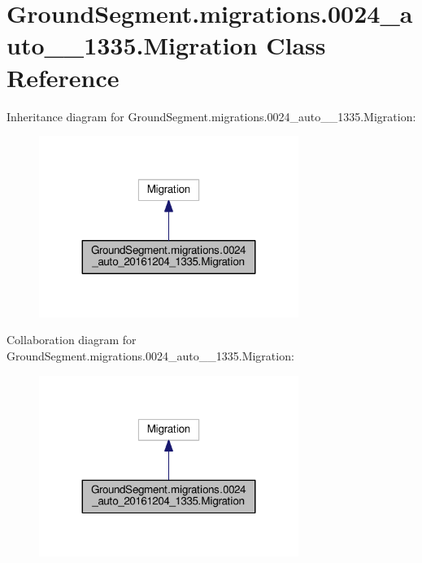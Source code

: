 \hypertarget{class_ground_segment_1_1migrations_1_10024__auto__20161204__1335_1_1_migration}{}\section{Ground\+Segment.\+migrations.0024\+\_\+auto\+\_\+\_\+1335.Migration Class Reference}
\label{class_ground_segment_1_1migrations_1_10024__auto__20161204__1335_1_1_migration}


Inheritance diagram for Ground\+Segment.\+migrations.0024\+\_\+auto\+\_\+\_\+1335.Migration\+:\nopagebreak
\begin{figure}[H]
\begin{center}
\leavevmode
\includegraphics[width=239pt]{class_ground_segment_1_1migrations_1_10024__auto__20161204__1335_1_1_migration__inherit__graph}
\end{center}
\end{figure}


Collaboration diagram for Ground\+Segment.\+migrations.0024\+\_\+auto\+\_\+\_\+1335.Migration\+:\nopagebreak
\begin{figure}[H]
\begin{center}
\leavevmode
\includegraphics[width=239pt]{class_ground_segment_1_1migrations_1_10024__auto__20161204__1335_1_1_migration__coll__graph}
\end{center}
\end{figure}
